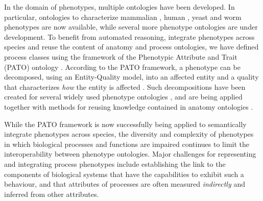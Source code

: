\documentclass{bioinfo}
\renewcommand{\cite}{\citep}
\providecommand{\DIFaddbegin}{} %
\providecommand{\DIFaddend}{} %
\providecommand{\DIFdelbegin}{} %
\providecommand{\DIFdelend}{} %
\begin{document}
In the domain of phenotypes, multiple ontologies have been
developed. In particular, ontologies to characterize mammalian
\cite{Smith2004}, human \cite{Robinson2008}, yeast \DIFdelbegin %
\DIFdelend \DIFaddbegin \cite{aposhort} \DIFaddend and
worm \cite{wpo} phenotypes are now available, while several more
phenotype ontologies are under development. To benefit from automated
reasoning, integrate phenotypes across species and reuse the content
of anatomy and process ontologies, we have defined process classes
using the framework of the Phenotypic Attribute and Trait (PATO)
ontology \cite{Gkoutos2005}. According to the PATO framework, a
phenotype can be decomposed, using an Entity-Quality model, into an
affected entity and a quality that characterizes {\em how} the entity
is affected \cite{Gkoutos2005}. Such decompositions have been created
for several widely used phenotype ontologies \cite{Mungall2010,
  Gkoutos2009b, obml2011h1}, and are being applied together with
methods for reusing knowledge contained in anatomy ontologies
\cite{Mungall2010, Hoehndorf2010phene}.

While the PATO framework is now successfully being applied to
semantically integrate phenotypes across species, the diversity and
complexity of phenotypes in which biological processes and functions
are impaired continues to limit the interoperability between phenotype
ontologies. Major challenges for representing and integrating process
phenotypes include establishing the link to the components of
biological systems that have the capabilities to exhibit such a
behaviour, and that attributes of processes are often measured {\em
  indirectly} and inferred from other attributes.
\end{document}
